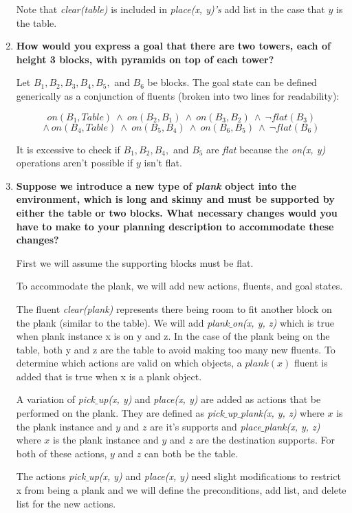 \documentclass[11pt, letterpaper]{hw}
\begin{document}
\begin{enumerate}
Note that \textit{clear(table)} is included in \textit{place(x, y)'s} add list in the case that $y$ is the table.

\item \textbf{How would you express a goal that there are two towers, each of height 3 blocks, with pyramids on top of each tower?}

Let $B_1, B_2, B_3, B_4, B_5,$ and $B_6$ be blocks. The goal state can be defined generically as a conjunction of fluents (broken into two lines for readability):

$$on(B_1, Table) \ \wedge \ on(B_2, B_1) \ \wedge \ on(B_3, B_2) \ \wedge \ \neg flat(B_3)$$
$$\wedge \ on(B_4, Table) \ \wedge \ on(B_5, B_4) \ \wedge \ on(B_6, B_5) \ \wedge \ \neg flat(B_6)$$

It is excessive to check if $B_1, B_2, B_4,$ and $B_5$ are \textit{flat} because the \textit{on(x, y)} operations aren't possible if $y$ isn't flat.

\item \textbf{Suppose we introduce a new type of \emph{plank} object into the environment, which is long and skinny and must be supported by either the table or two blocks. What necessary changes would you have to make to your planning description to accommodate these changes?}

First we will assume the supporting blocks must be flat.

To accommodate the plank, we will add new actions, fluents, and goal states.

The fluent \textit{clear(plank)} represents there being room to fit another block on the plank (similar to the table). We will add \textit{plank$
\_$on(x, y, z)} which is true when plank instance x is on y and z. In the case of the plank being on the table, both y and z are the table to avoid making too many new fluents. To determine which actions are valid on which objects, a $plank(x)$ fluent is added that is true when x is a plank object.

A variation of \textit{pick$\_$up(x, y)} and \textit{place(x, y)} are added as actions that be performed on the plank. They are defined as \textit{pick$\_$up$\_$plank(x, y, z)} where $x$ is the plank instance and $y$ and $z$ are it's supports and \textit{place$\_$plank(x, y, z)} where $x$ is the plank instance and $y$ and $z$ are the destination supports. For both of these actions, $y$ and $z$ can both be the table.

The actions \textit{pick$\_$up(x, y)} and \textit{place(x, y)} need slight modifications to restrict x from being a plank and we will define the preconditions, add list, and delete list for the new actions.


\end{enumerate}
\end{document}

